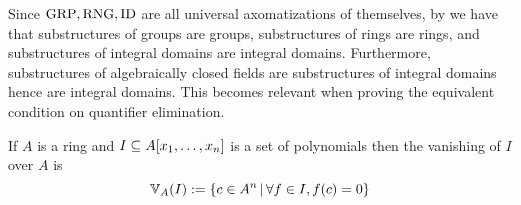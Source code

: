 \begin{rmk}
    Since $\operatorname{GRP}, \mathrm{RNG}, \operatorname{ID}$ are all universal axomatizations of themselves,
    by  we have that
    substructures of groups are groups, 
    substructures of rings are rings, 
    and substructures of integral domains are integral domains.
    Furthermore, 
    substructures of algebraically closed fields are 
    substructures of integral domains hence are integral domains.
    This becomes relevant when proving the equivalent condition on quantifier
    elimination.
\end{rmk}

\begin{nttn}
    If $A$ is a ring and 
    $I \subseteq A[x_1, \dots, x_n]$ is a set of polynomials then
    the vanishing of $I$ over $A$ is
    \[\mathbb{V}_{A}(I) := \left\{c \in A^n \,|\, \forall f \in I, f(c) = 0\right\}\]
\end{nttn}

